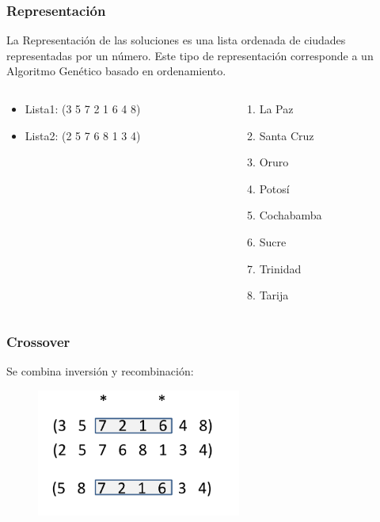 \documentclass[10pt]{beamer}
\begin{document}
\begin{frame}
  \frametitle{Representación}

  La Representación de las soluciones es una lista ordenada de ciudades representadas 
  por un número. Este tipo de representación corresponde a un Algoritmo Genético basado
  en ordenamiento.

  \begin{columns}
    \begin{column}{0.5\textwidth}
      \begin{itemize}
        \item Lista1: (3 5 7 2 1 6 4 8)
        \item Lista2: (2 5 7 6 8 1 3 4)
      \end{itemize} 
    \end{column}
    \begin{column}{0.5\textwidth}
      \begin{enumerate}
        \item La Paz
        \item Santa Cruz
        \item Oruro
        \item Potosí
        \item Cochabamba
        \item Sucre
        \item Trinidad
        \item Tarija
      \end{enumerate} 
    \end{column}
  \end{columns}

\end{frame}

\begin{frame}
  \frametitle{Crossover}

  Se combina inversión y recombinación:

  \begin{figure}[!h] 
    \centering
    \includegraphics[width=0.6\textwidth]{img/cross2}
  \end{figure}

\end{frame}
\end{document}
